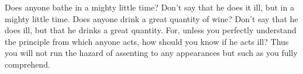 Does anyone bathe in  a mighty little time? Don't say that he  does it ill, but
in a mighty little time. Does anyone  drink a great quantity of wine? Don't say
that  he does  ill,  but that  he  drinks  a great  quantity.  For, unless  you
perfectly understand the principle from which  anyone acts, how should you know
if  he  acts ill?  Thus  you  will  not run  the  hazard  of assenting  to  any
appearances but such as you fully comprehend.
